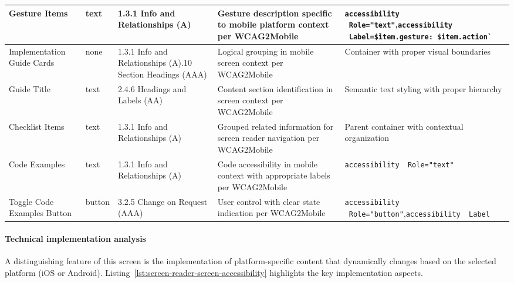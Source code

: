 \begin{longtable}[c]{|C{2.5cm}|C{2cm}|C{2.8cm}|C{3.5cm}|C{4.7cm}|}
\hline
Gesture Items & text & 1.3.1 Info and Relationships (A) & Gesture description specific to mobile platform context per WCAG2Mobile & \texttt{accessibility \ Role="text"},\newline \texttt{accessibility \ Label=\`\${item.gesture}: \${item.action}\`} \\
\hline
Implementation Guide Cards & none & 1.3.1 Info and Relationships (A).10 Section Headings (AAA) & Logical grouping in mobile screen context per WCAG2Mobile & Container with proper visual boundaries \\
\hline
Guide Title & text & 2.4.6 Headings and Labels (AA) & Content section identification in screen context per WCAG2Mobile & Semantic text styling with proper hierarchy \\
\hline
Checklist Items & text & 1.3.1 Info and Relationships (A) & Grouped related information for screen reader navigation per WCAG2Mobile & Parent container with contextual organization \\
\hline
Code Examples & text & 1.3.1 Info and Relationships (A) & Code accessibility in mobile context with appropriate labels per WCAG2Mobile & \texttt{accessibility \ Role="text"} \\
\hline
Toggle Code Examples Button & button & 3.2.5 Change on Request (AAA) & User control with clear state indication per WCAG2Mobile & \texttt{accessibility \ Role="button"},\newline \texttt{accessibility \ Label} \\
\hline
\end{longtable}
\FloatBarrier

\paragraph{Technical implementation analysis}

A distinguishing feature of this screen is the implementation of platform-specific content that dynamically changes based on the selected platform (iOS or Android). Listing~\ref{lst:screen-reader-screen-accessibility} highlights the key implementation aspects.

